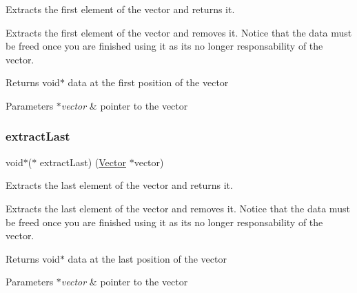 Extracts the first element of the vector and returns it. 

Extracts the first element of the vector and removes it. Notice that the data must be freed once you are finished using it as it\textquotesingle{}s no longer responsability of the vector.

\begin{DoxyReturn}{Returns}
void$\ast$ data at the first position of the vector 
\end{DoxyReturn}

\begin{DoxyParams}{Parameters}
{\em $\ast$vector} & pointer to the vector \\
\hline
\end{DoxyParams}
\mbox{\label{structadt__vector__ops__s_a894800a5e4120597f0329f8a972de02b}} 
\subsubsection{\texorpdfstring{extract\+Last}{extractLast}}
{\footnotesize\ttfamily void$\ast$($\ast$ extract\+Last) (\hyperlink{structadt__vector__s}{Vector} $\ast$vector)}



Extracts the last element of the vector and returns it. 

Extracts the last element of the vector and removes it. Notice that the data must be freed once you are finished using it as it\textquotesingle{}s no longer responsability of the vector.

\begin{DoxyReturn}{Returns}
void$\ast$ data at the last position of the vector 
\end{DoxyReturn}

\begin{DoxyParams}{Parameters}
{\em $\ast$vector} & pointer to the vector \\
\hline
\end{DoxyParams}
\mbox{\label{structadt__vector__ops__s_a8d74c83f60e3a66ac844119ff0f6130b}} 
